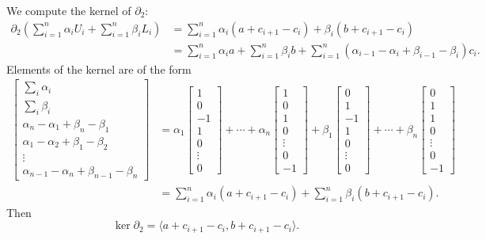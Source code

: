 \documentclass[12pt]{article}
\theoremstyle{definition}
\newcommand{\<}{\langle}
\renewcommand{\>}{\rangle}
\newcommand{\mat}[1]{\begin{bmatrix}#1\end{bmatrix}}
\newcommand{\bd}{\partial}
\begin{document}
We compute the kernel of $\bd_2$:
\begin{align*}
    \bd_2(\textstyle\sum_{i=1}^{n} \alpha_i U_i + \sum_{i=1}^{n} \beta_i L_i)
        &= \sum_{i=1}^{n} \alpha_i(a + c_{i+1} - c_i) + \beta_i(b + c_{i+1} - c_i) \\
        &= \sum_{i=1}^{n} \alpha_i a + \sum_{i=1}^{n} \beta_i b + \sum_{i=1}^{n} (\alpha_{i-1} - \alpha_i + \beta_{i-1} - \beta_i)c_i.
\end{align*}
Elements of the kernel are of the form
\begin{align*}
    \mat{
        \sum_i \alpha_i \\
        \sum_i \beta_i \\
        \alpha_n - \alpha_1 + \beta_n - \beta_1 \\
        \alpha_1 - \alpha_2 + \beta_1 - \beta_2 \\
        \vdots \\
        \alpha_{n-1} - \alpha_n + \beta_{n-1} - \beta_n
    }
        &= \alpha_1 \mat{1 \\ 0 \\ -1 \\ 1 \\ 0 \\ \vdots \\ 0}
            + \cdots
            + \alpha_n \mat{1 \\ 0 \\ 1 \\ 0 \\ \vdots \\ 0 \\ -1}
            + \beta_1 \mat{0 \\ 1 \\ -1 \\ 1 \\ 0 \\ \vdots \\ 0}
            + \cdots
            + \beta_n \mat{0 \\ 1 \\ 1 \\ 0 \\ \vdots \\ 0 \\ -1} \\
        &= \sum_{i=1}^{n} \alpha_i(a + c_{i+1} - c_i) +   \sum_{i=1}^{n} \beta_i(b + c_{i+1} - c_i).
\end{align*}
Then
\[
    \ker\bd_2 = \<a + c_{i+1} - c_i, b + c_{i+1} - c_i\>.
\]
\end{document}
